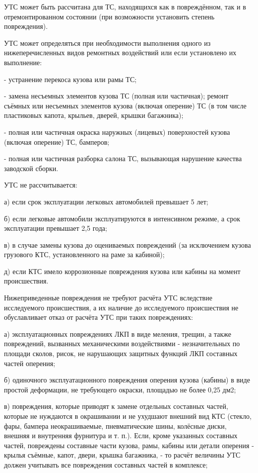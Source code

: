 	УТС может быть рассчитана для ТС, находящихся как в повреждённом, так и в отремонтированном состоянии (при возможности установить степень повреждения).

УТС может определяться при необходимости выполнения одного из нижеперечисленных видов ремонтных воздействий или если установлено их выполнение:

-	устранение перекоса кузова или рамы ТС;

-	замена несъемных элементов кузова ТС (полная или частичная); ремонт съёмных или несъемных элементов кузова (включая оперение) ТС (в том числе пластиковых капота, крыльев, дверей, крышки багажника);

-	полная или частичная окраска наружных (лицевых) поверхностей кузова (включая оперение) ТС, бамперов;

-	полная или частичная разборка салона ТС, вызывающая нарушение качества заводской сборки.

УТС не рассчитывается:

а)	если срок эксплуатации легковых автомобилей превышает 5 лет;

б)	если легковые автомобили эксплуатируются в интенсивном режиме, а срок эксплуатации превышает 2,5 года;


в)	в случае замены кузова до оцениваемых повреждений (за исключением кузова грузового КТС, установленного на раме за кабиной);


д)	если КТС имело коррозионные повреждения кузова или кабины на момент происшествия.



Нижеприведенные повреждения не требуют расчёта УТС вследствие исследуемого происшествия, а их наличие до исследуемого происшествия не обуславливает отказ от расчёта УТС при таких повреждениях:

а)	эксплуатационных повреждениях ЛКП в виде меления, трещин, а также повреждений, вызванных механическими воздействиями - незначительных по площади сколов, рисок, не нарушающих защитных функций ЛКП составных частей оперения;

б)	одиночного эксплуатационного повреждения оперения кузова (кабины) в виде простой деформации, не требующего окраски, площадью не более 0,25 дм2;

в)	повреждения, которые приводят к замене отдельных составных частей, которые не нуждаются в окрашивании и не ухудшают внешний вид КТС (стекло, фары, бампера неокрашиваемые, пневматические шины, колёсные диски, внешняя и внутренняя фурнитура и т. п.). Если, кроме указанных составных частей, повреждены составные части кузова, рамы, кабины или детали оперения - крылья съёмные, капот, двери, крышка багажника, - то расчёт величины УТС должен учитывать все повреждения составных частей в комплексе;

